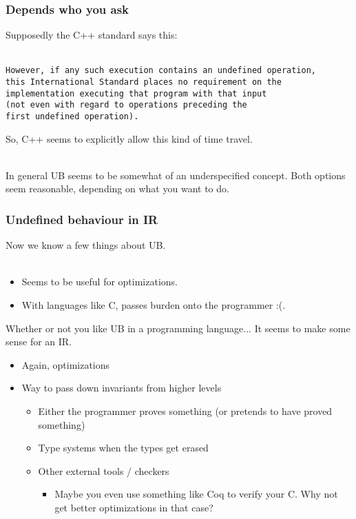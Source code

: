 \documentclass{beamer}
\begin{document}
\begin{frame}[fragile]
  \frametitle{Depends who you ask}

  Supposedly the C++ standard says this:\\~

\begin{verbatim}
However, if any such execution contains an undefined operation,
this International Standard places no requirement on the
implementation executing that program with that input
(not even with regard to operations preceding the
first undefined operation).
\end{verbatim}

  \pause

  So, C++ seems to explicitly allow this kind of time travel.\\~

  In general UB seems to be somewhat of an underspecified
  concept. Both options seem reasonable, depending on what you want to
  do.

\end{frame}

\begin{frame}
  \frametitle{Undefined behaviour in IR}

  Now we know a few things about UB.\\~

  \begin{itemize}
  \item Seems to be useful for optimizations.
  \item With languages like C, passes burden onto the programmer :(.
  \end{itemize}

  Whether or not you like UB in a programming language... It seems to
  make some sense for an IR.

  \begin{itemize}
  \item Again, optimizations
  \item Way to pass down invariants from higher levels
    \begin{itemize}
    \item Either the programmer proves something (or pretends to have
      proved something)
    \item Type systems when the types get erased
    \item Other external tools / checkers
      \begin{itemize}
      \item Maybe you even use something like Coq to verify your
        C. Why not get better optimizations in that case?
      \end{itemize}
    \end{itemize}
  \end{itemize}
\end{frame}
\end{document}

